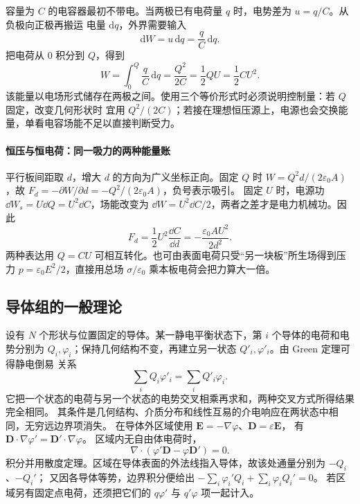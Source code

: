 容量为 $C$ 的电容器最初不带电。当两极已有电荷量 $q$ 时，电势差为 $u=q/C$。从负极向正极再搬运
电量 $\mathrm dq$，外界需要输入
\begin{equation}
  \mathrm dW=u\,\mathrm dq=\frac qC\,\mathrm dq.
\end{equation}
把电荷从 $0$ 积分到 $Q$，得到
\begin{equation}
  \boxed{W=\int_0^Q\frac qC\,\mathrm dq
  =\frac{Q^2}{2C}=\frac12QU=\frac12CU^2}.
\end{equation}
该能量以电场形式储存在两极之间。使用三个等价形式时必须说明控制量：若 $Q$ 固定，改变几何形状时
宜用 $Q^2/(2C)$；若接在理想恒压源上，电源也会交换能量，单看电容场能不足以直接判断受力。


\paragraph{恒压与恒电荷：同一吸力的两种能量账}
平行板间距取 $d$，增大 $d$ 的方向为广义坐标正向。固定 $Q$ 时
$W=Q^2d/(2\varepsilon_0A)$，故
$F_d=-\partial W/\partial d=-Q^2/(2\varepsilon_0A)$，负号表示吸引。
固定 $U$ 时，电源功 $\dd W_s=U\dd Q=U^2\dd C$，场能改变为 $\dd W=U^2\dd C/2$，两者之差才是电力机械功。因此
\[
 F_d=\frac12U^2\frac{\dd C}{\dd d}
 =-\frac{\varepsilon_0AU^2}{2d^2}.
\]
两种表达用 $Q=CU$ 可相互转化。也可由表面电荷只受“另一块板”所生场得到压力 $p=\varepsilon_0E^2/2$，直接用总场 $\sigma/\varepsilon_0$ 乘本板电荷会把力算大一倍。

\subsection*{导体组的一般理论}

设有 $N$ 个形状与位置固定的导体。某一静电平衡状态下，第 $i$ 个导体的电荷和电势分别为
$Q_i,\varphi_i$；保持几何结构不变，再建立另一状态 $Q'_i,\varphi'_i$。由 Green 定理可得静电倒易
关系
\begin{equation}
  \boxed{\sum_iQ_i\varphi'_i=\sum_iQ'_i\varphi_i}.
\end{equation}
它把一个状态的电荷与另一个状态的电势交叉相乘再求和，两种交叉方式所得结果完全相同。
其条件是几何结构、介质分布和线性互易的介电响应在两状态中相同，无穷远边界项消失。
在导体外区域使用 $\boldsymbol E=-\nabla\varphi$、$\boldsymbol D=\varepsilon\boldsymbol E$，
有 $\boldsymbol D\cdot\nabla\varphi'=\boldsymbol D'\cdot\nabla\varphi$。
区域内无自由体电荷时，
\[
 \nabla\cdot(\varphi'\boldsymbol D-\varphi\boldsymbol D')=0.
\]
积分并用散度定理。区域在导体表面的外法线指入导体，故该处通量分别为 $-Q_i$、$-Q_i'$；
又因各导体等势，边界积分便给出
$-\sum_i\varphi_i'Q_i+\sum_i\varphi_iQ_i'=0$。
若区域另有固定点电荷，还须把它们的 $q\varphi'$ 与 $q'\varphi$ 项一起计入。

